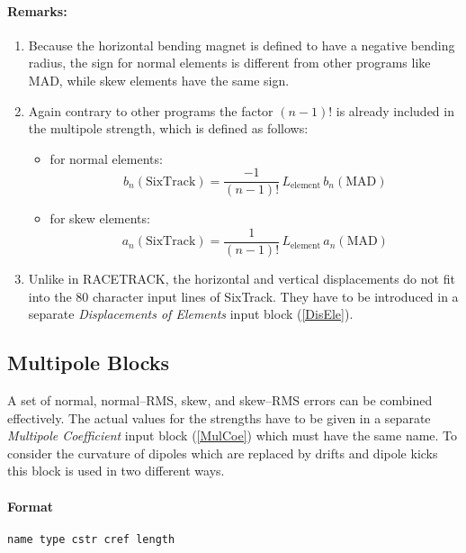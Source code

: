 \paragraph{Remarks:}
\begin{enumerate}
    \item Because the horizontal bending magnet is defined to have a negative bending radius, the sign for normal elements is different from other programs like MAD, while skew elements have the same sign.
    \item Again contrary to other programs the factor \mbox{$(n-1)$!} is already included in the multipole strength, which is defined as follows:
    \begin{itemize}
        \item for normal elements:
        \begin{equation*}
            b_{n}(\mathrm{SixTrack}) = \frac{-1}{(n-1)!}\,L_{\mathrm{element}}\,b_{n}(\mathrm{MAD})
        \end{equation*}
        \item for skew elements:
        \begin{equation*}
            a_{n}(\mathrm{SixTrack}) = \frac{1}{(n-1)!}\,L_{\mathrm{element}}\,a_{n}(\mathrm{MAD})
        \end{equation*}
    \end{itemize}
    \item Unlike in RACETRACK, the horizontal and vertical displacements do not fit into the 80 character input lines of SixTrack\@. They have to be introduced in a separate \textit{Displacements of Elements} input block (\ref{DisEle}).
\end{enumerate}

\subsection{Multipole Blocks} \label{MulBlo}

A set of normal, normal--RMS, skew, and skew--RMS errors can be combined effectively.
The actual values for the strengths have to be given in a separate \textit{Multipole Coefficient} input block (\ref{MulCoe}) which must have the same name.
To consider the curvature of dipoles which are replaced by drifts and dipole kicks this block is used in two different ways.

\paragraph{Format} \texttt{name type cstr cref length}


